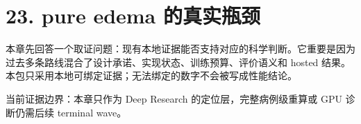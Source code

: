 \section{23. pure edema 的真实瓶颈}

本章先回答一个取证问题：现有本地证据能否支持对应的科学判断。它重要是因为过去多条路线混合了设计承诺、实现状态、训练预算、评价语义和 hosted 结果。本包只采用本地可绑定证据；无法绑定的数字不会被写成性能结论。



当前证据边界：本章只作为 Deep Research 的定位层，完整病例级重算或 GPU 诊断仍需后续 terminal wave。



\clearpage